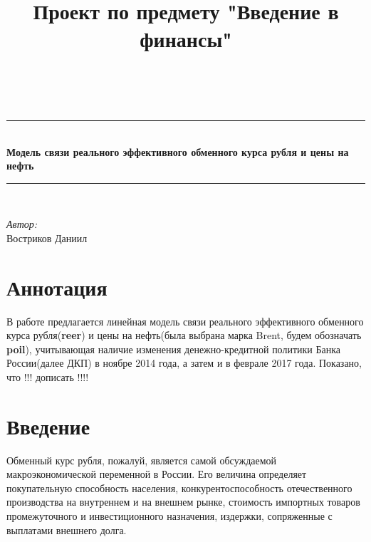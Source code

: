 \documentclass{article}
\title{Проект по предмету "Введение в финансы"}
\author{\\}
\begin{document}
    \maketitle
    \thispagestyle{empty}
	\begin{center}
		\rule{\linewidth}{0.5mm} \\[0.4cm]
	{ \Huge\bfseries Модель связи реального эффективного обменного курса рубля и цены на нефть\\  [0.4cm] }
		\rule{\linewidth}{0.5mm} \\[0.4cm]
	\end{center}	
	
    \begin{minipage}{0.6\textwidth}
	\begin{flushleft} \large
		\emph{Автор:}\\
		Востриков Даниил
	\end{flushleft}
\end{minipage}


\newpage 

\section{Аннотация}
В работе предлагается линейная модель связи реального эффективного обменного  курса рубля(\textbf{reer})  и цены на нефть(была выбрана марка Brent, будем обозначать \textbf{poil}), учитывающая наличие изменения денежно-кредитной политики Банка России(далее ДКП) в ноябре 2014 года, а затем и в феврале 2017 года. Показано, что !!! дописать !!!!
\section{Введение}
Обменный курс рубля, пожалуй, является самой обсуждаемой макроэкономической переменной в России. Его величина определяет покупательную способность населения, конкурентоспособность отечественного производства на внутреннем и на внешнем рынке, стоимость импортных товаров промежуточного и инвестиционного назначения, издержки, сопряженные с выплатами внешнего долга.
\end{document}
